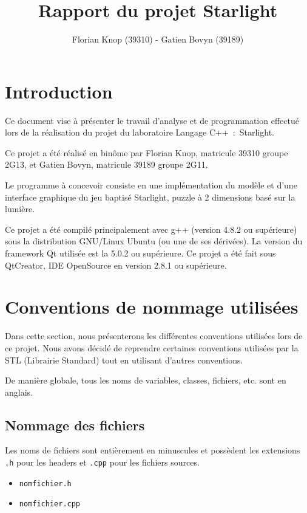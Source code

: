 \documentclass[]{report}
\title{Rapport du projet Starlight}
\author{Florian Knop (39310) - Gatien Bovyn (39189)}
\begin{document}
\lstset{language=C++}  
\maketitle

\newpage

\tableofcontents

\newpage

\section{Introduction}


Ce document vise à présenter le travail d’analyse et de programmation effectué
lors de la réalisation du projet du laboratoire Langage C++~:~Starlight.

Ce projet a été réalisé en binôme par Florian Knop, matricule 39310 groupe 2G13,
et Gatien Bovyn, matricule 39189 groupe 2G11.

Le programme à concevoir consiste en une implémentation du modèle et d’une interface
graphique du jeu baptisé Starlight, puzzle à 2 dimensions basé sur la lumière.

Ce projet a été compilé principalement avec g++
(version 4.8.2 ou supérieure)
sous la distribution GNU/Linux Ubuntu (ou une de ses dérivées).
La version du framework Qt utilisée est la 5.0.2 ou supérieure.
Ce projet a été fait sous QtCreator, IDE OpenSource en version 2.8.1 ou
supérieure.


\section{Conventions de nommage utilisées}

Dans cette section, nous présenterons les différentes conventions 
utilisées lors de ce projet. Nous avons décidé de reprendre certaines
conventions utilisées par la STL (Librairie Standard)
tout en utilisant d'autres conventions.

De manière globale, tous les noms de variables, classes, fichiers, etc.
sont en anglais.

\subsection{Nommage des fichiers}

Les noms de fichiers sont entièrement en minuscules
et possèdent les extensions \texttt{.h}
pour les headers et \texttt{.cpp} pour les fichiers sources.

\begin{itemize}
	\item \texttt{nomfichier.h}
	\item \texttt{nomfichier.cpp}
\end{itemize}
\end{document}
